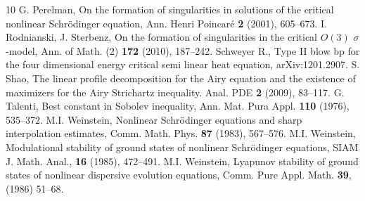 \documentclass[11pt,a4paper,reqno]{amsart}
\theoremstyle{remark}
\numberwithin{equation}{section}
\begin{document}
\begin{thebibliography}{10}
 G. Perelman, On the formation of singularities in solutions of the critical nonlinear Schr\"odinger equation, Ann. Henri Poincar\'e \textbf{2} (2001), 605--673.
   I. Rodnianski, J. Sterbenz,  On the formation of singularities in the critical $O(3)$ $\sigma$-model, Ann. of Math. (2) \textbf{172} (2010),   187--242.
   Schweyer R., Type II blow bp for the four dimensional energy critical semi linear heat equation,  arXiv:1201.2907. 
   S. Shao,  The linear profile decomposition for the Airy equation and the existence of maximizers for the Airy Strichartz inequality. Anal. PDE \textbf{2} (2009),   83--117.
   G. Talenti, Best constant in Sobolev inequality, Ann. Mat. Pura Appl. \textbf{110} (1976), 535--372.
 M.I. Weinstein, Nonlinear Schr\"odinger equations and sharp interpolation estimates, Comm. Math. Phys. \textbf{87} (1983), 567--576.
  M.I.  Weinstein, Modulational stability of ground states of nonlinear Schr\"odinger equations, SIAM J. Math. Anal., \textbf{16} (1985), 472--491.
 M.I. Weinstein, Lyapunov stability of ground states of nonlinear dispersive evolution equations, Comm. Pure Appl. Math. \textbf{39}, (1986) 51--68.
\end{thebibliography}
\end{document}
